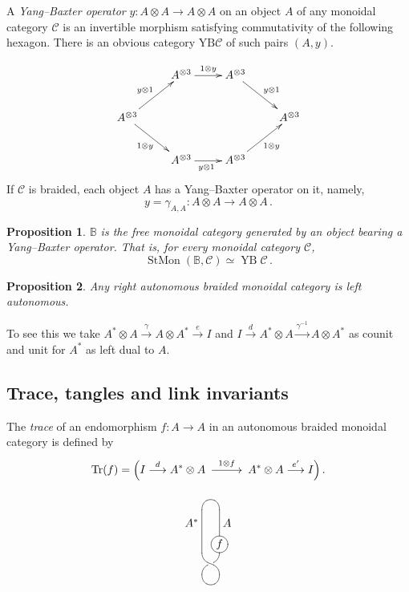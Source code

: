 \documentclass[a4paper,12pt]{article}
\makeatletter
\newtheorem*{Proposition}{Proposition}
\theoremstyle{definition}
\theoremstyle{fact}
\theoremstyle{genquest}
\theoremstyle{step}
\newcommand{\BB}{\mathbb{B}}
\newcommand{\catC}{\mathcal{C}}
\newcommand{\StMon}{\operatorname{StMon}}
\newcommand{\Tr}{\operatorname{Tr}}
\newcommand{\YB}{\operatorname{YB}}
\newcommand{\longto}{\longrightarrow}
\newcommand{\xylongto}[2][2pt]{{\UseTips{}\xymatrix @C+#1{ \ar[r]^{#2}&}}}
\makeatother
\begin{document}
\bigskip

A \emph{Yang--Baxter operator} $y : A \otimes A \to A \otimes A$ on an object  $A$ of any monoidal category $\catC$ is an invertible morphism  satisfying commutativity of the following hexagon. There is an obvious category $\mathrm{YB}\catC$ of such pairs $(A,y)$.

\begin{equation*}
\xymatrix{& A^{\otimes 3} \ar[r]^{1\otimes y} & A^{\otimes 3} \ar[rd]^{y\otimes 1} \\
 A^{\otimes 3}\ar[ru]^{y\otimes 1}  \ar[rd]_{1\otimes y}  & & & A^{\otimes 3} \\
 & A^{\otimes 3}  \ar[r]_{y\otimes 1 \ } & A^{\otimes 3} \ar[ru]_{1\otimes y} }
 \end{equation*}
If $\catC$ is braided, each object $A$ has a Yang--Baxter operator on it, namely,
\[
y =  \gamma^{}_{A,A} : A \otimes A \longto A \otimes A\,.
\]


\begin{Proposition} 
$\BB$  is the free monoidal category generated by an object bearing a Yang--Baxter operator.   That is, for every monoidal category $\catC$, 
\[
\StMon(\BB,\catC) \simeq \YB \catC\,.
\]
\end{Proposition} 

\begin{Proposition} 
Any right autonomous braided monoidal category is left autonomous.
\end{Proposition} 

\noindent
To see this we take $A^\ast \otimes A \stackrel{\gamma}{\longto}  A \otimes A^\ast   \stackrel{e}{\longto}  I$ 
and $I   \stackrel{d}{\longto}  A^\ast \otimes A \stackrel{\gamma^{-1}}{\longto}  A \otimes A^\ast$ as counit 
and unit for $A^\ast$ as left dual to $A$. 

\subsection{Trace, tangles and link invariants}

The \emph{trace} of an endomorphism
$ f : A    \longto   A $
in an autonomous braided monoidal category is defined by
\[
\Tr (f) = \Bigl(I \stackrel{d}{\longto} A^\ast \otimes A \xylongto{1 \otimes f} %
  A^\ast \otimes A \stackrel{e'}{\longto}  I\Bigr)\,.
\]
\[
\xygraph{
!{/r1.3pc/: /u1.6pc/::}
!{\vcap} ( [r] - [dd] ^(.3)*{A}|(.8)*+[Fo]{f}
, ? - [dd] _(.3)*{A^*}
!{\vtwistneg}
!{\vcap[-]}
)}
\]
\end{document}
